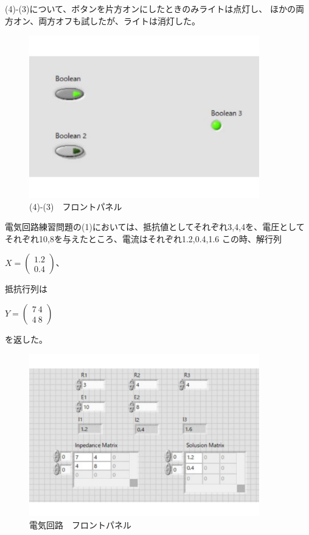 \documentclass[a4paper,titlepage,11pt]{ltjsarticle}
\begin{document}
  (4)-(3)について、ボタンを片方オンにしたときのみライトは点灯し、
  ほかの両方オン、両方オフも試したが、ライトは消灯した。

  \begin{figure}[H]
    \begin{center}
      \includegraphics[width=100mm]{4-3f.pdf}
      \caption{(4)-(3)　フロントパネル}
    \end{center}
  \end{figure}

電気回路練習問題の(1)においては、抵抗値としてそれぞれ3,4,4を、電圧として
それぞれ10,8を与えたところ、電流はそれぞれ1.2,0.4,1.6
この時、解行列

$X=\left(
  \begin{array}{r}
  1.2\\
  0.4
  \end{array}
\right)$、

抵抗行列は

$Y=\left(
  \begin{array}{rr}
  7 \ 4\\
  4 \ 8
  \end{array}
\right)$

を返した。

\begin{figure}[H]
  \begin{center}
    \includegraphics[width=100mm]{e3f.pdf}
    \caption{電気回路　フロントパネル}
  \end{center}
\end{figure}
\end{document}
